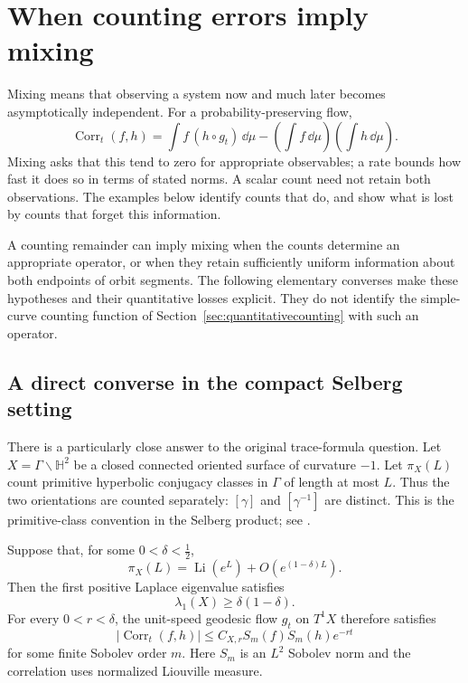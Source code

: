 \section{When counting errors imply mixing}
\label{sec:countmixing}

Mixing means that observing a system now and much later becomes
asymptotically independent. For a probability-preserving flow,
\[
 \operatorname{Corr}_t(f,h)=
 \int f\,(h\circ g_t)\,\dd\mu
       -\left(\int f\,\dd\mu\right)\left(\int h\,\dd\mu\right).
\]
Mixing asks that this tend to zero for appropriate observables;
a rate bounds how fast it does so in terms of stated norms.
A scalar count need not retain both observations. The examples
below identify counts that do, and show what is lost by counts
that forget this information.

A counting remainder can imply mixing when the counts determine an
appropriate operator, or when they retain sufficiently uniform information
about both endpoints of orbit segments. The following elementary
converses make these hypotheses and their quantitative losses explicit.
They do not identify the simple-curve counting function of
Section~\ref{sec:quantitativecounting} with such an operator.

\subsection{A direct converse in the compact Selberg setting}
\label{subsec:countmixselberg}

There is a particularly close answer to the original trace-formula
question. Let $X=\Gamma\backslash\mathbb H^2$ be a closed connected
oriented surface of curvature $-1$. Let $\pi_X(L)$ count primitive
hyperbolic conjugacy classes in $\Gamma$ of length at most $L$.
Thus the two orientations are counted separately: $[\gamma]$ and
$[\gamma^{-1}]$ are distinct. This is the primitive-class convention
in the Selberg product; see \cite[Section~2.1]{PollicottSharpZeta}.

\begin{proposition}
\label{prop:countmixselberg}
Suppose that, for some $0<\delta<\tfrac12$,
\begin{equation}
 \pi_X(L)=\operatorname{Li}(e^L)+O(e^{(1-\delta)L}).
 \label{eq:countmixselbergcount}
\end{equation}
Then the first positive Laplace eigenvalue satisfies
\begin{equation}
 \lambda_1(X)\geq\delta(1-\delta).
 \label{eq:countmixselberggap}
\end{equation}
For every $0<r<\delta$, the unit-speed geodesic flow $g_t$ on $T^1X$
therefore satisfies
\begin{equation}
 |\operatorname{Corr}_t(f,h)|
 \leq C_{X,r}S_m(f)S_m(h)e^{-rt}
 \label{eq:countmixselbergmixing}
\end{equation}
for some finite Sobolev order $m$. Here $S_m$ is an $L^2$ Sobolev norm
and the correlation uses normalized Liouville measure.
\end{proposition}

